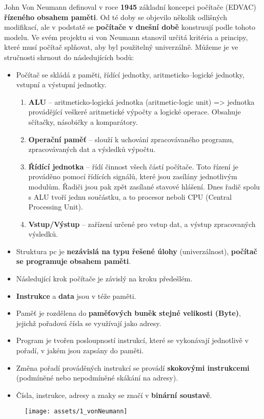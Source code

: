 John Von Neumann definoval v roce \textbf{1945} základní koncepci počítače (EDVAC) \textbf{řízeného obsahem paměti}. Od té doby se objevilo několik odlišných modifikací, ale v podstatě se \textbf{počítače v dnešní době} konstruují podle tohoto modelu. Ve svém projektu si von Neumann stanovil určitá kritéria a principy, které musí počítač splňovat, aby byl použitelný univerzálně. Můžeme je ve stručnosti shrnout do následujících bodů:
\begin{itemize}
    \item Počítač se skládá z paměti, řídící jednotky, aritmeticko--logické jednotky, vstupní a  výstupní jednotky.
          \begin{enumerate}
              \item \textbf{ALU} -- aritmeticko-logická jednotka (aritmetic-logic unit) => jednotka provádějící veškeré aritmetické výpočty a logické operace. Obsahuje sčítačky, násobičky a komparátory.
              \item  \textbf{Operační paměť} -- slouží k uchování zpracovávaného programu, zpracovávaných dat a výsledků výpočtu.
              \item \textbf{Řídící jednotka} -- řídí činnost všech částí počítače. Toto řízení je prováděno pomocí řídících signálů, které jsou zasílány jednotlivým modulům. Řadiči jsou pak zpět zasílané stavové hlášení. Dnes řadič spolu s ALU tvoří jednu součástku, a to procesor neboli CPU (Central Processing Unit).
              \item \textbf{Vstup/Výstup} -- zařízení určené pro vstup dat, a výstup zpracovaných výsledků.
          \end{enumerate}
    \item Struktura pc je \textbf{nezávislá na typu řešené úlohy} (univerzálnost), \textbf{počítač se programuje obsahem paměti}.
    \item Následující krok počítače je závislý na kroku předešlém.
    \item \textbf{Instrukce} a \textbf{data} jsou v téže paměti.
    \item Paměť je rozdělena do \textbf{paměťových buněk stejné velikosti (Byte)}, jejichž pořadová čísla se využívají jako adresy.
    \item Program je tvořen posloupností instrukcí, které se vykonávají jednotlivě v pořadí, v jakém jsou zapsány do paměti.
    \item Změna pořadí prováděných instrukcí se provádí \textbf{skokovými instrukcemi} (podmíněné nebo nepodmíněné skákání na adresy).
    \item Čísla, instrukce, adresy a znaky se značí v \textbf{binární soustavě}.
\end{itemize}
\begin{figure}[H]
    \centering
    \texttt{[image: assets/1\_vonNeumann]}
\end{figure}

